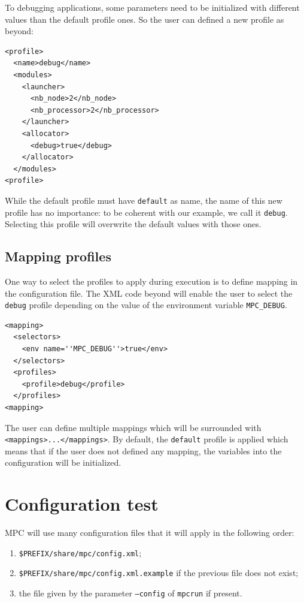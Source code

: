 \documentclass{article}
\begin{document}
To debugging applications, some parameters need to be initialized with different values than the default profile ones. So the user can defined a new profile as beyond:

\lstset{language=XML}
\begin{lstlisting}[title=Example of \texttt{debug} profile]
<profile>
  <name>debug</name>
  <modules>
    <launcher>
      <nb_node>2</nb_node>
      <nb_processor>2</nb_processor>
    </launcher>
    <allocator>
      <debug>true</debug>
    </allocator>
  </modules>
<profile>
\end{lstlisting}

\noindent While the default profile must have \texttt{default} as name, the name of this new profile has no importance: to be coherent with our example, we call it \texttt{debug}. Selecting this profile will overwrite the default values with those ones.

\subsection{Mapping profiles}

One way to select the profiles to apply during execution is to define mapping in the configuration file. The XML code beyond will enable the user to select the \texttt{debug} profile depending on the value of the environment variable \texttt{MPC\_DEBUG}.

\lstset{language=XML}
\begin{lstlisting}[title=Example of mapping to apply \texttt{debug} profile]
<mapping>
  <selectors>
    <env name=''MPC_DEBUG''>true</env>
  </selectors>
  <profiles>
    <profile>debug</profile>
  </profiles>
<mapping>
\end{lstlisting}

\noindent The user can define multiple mappings which will be surrounded with \texttt{<mappings>...</mappings>}. By default, the \texttt{default} profile is applied which means that if the user does not defined any mapping, the variables into the configuration will be initialized.

\section{Configuration test}

MPC will use many configuration files that it will apply in the following order:
\begin{enumerate}
\item \texttt{\$PREFIX/share/mpc/config.xml};
\item \texttt{\$PREFIX/share/mpc/config.xml.example} if the previous file does not exist;
\item the file given by the parameter \texttt{--config} of \texttt{mpcrun} if present.
\end{enumerate}
\end{document}
